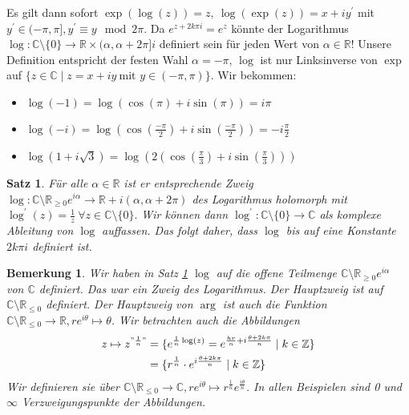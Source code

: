 \documentclass[a4paper,12pt]{article}
\theoremstyle{newthm}
\newtheorem{thm}{Satz}[subsection]
\theoremstyle{newdef}
\theoremstyle{newrem}
\newtheorem*{rem}{Bemerkung}
\newcommand{\Z}{\mathbb{Z}}
\newcommand{\R}{\mathbb{R}}
\newcommand{\C}{\mathbb{C}}
\begin{document}
		Es gilt dann sofort $ \exp(\log(z)) = z,\ \log(\exp(z)) = x+iy^\prime $ mit $ y^\prime \in (-\pi,\pi], y^\prime \equiv y \mod 2\pi. $ Da $ e^{z+2k\pi i} = e^z $ könnte der Logarithmus $ \log: \C \setminus\{0\} \to \R \times (\alpha,\alpha + 2 \pi] i $ definiert sein für jeden Wert von $ \alpha \in \R $! Unsere Definition entspricht der festen Wahl $ \alpha = -\pi $, $\log$ ist nur Linksinverse von $\exp$ auf $ \{ z \in \C \mid z=x+iy\ \text{mit } y \in (-\pi,\pi) \} $. Wir bekommen:
		\begin{itemize}
			\item $ \log(-1) = \log(\cos(\pi) + i\sin(\pi)) = i\pi $
			\item $ \log(-i) = \log\left( \cos \left( \frac{-\pi}{2} \right) + i \sin \left( \frac{-\pi}{2} \right) \right) = -i \frac{\pi}{2} $
			\item $ \log(1+i\sqrt{3}) = \log\left(2\left(\cos \left( \frac{\pi}{3} \right) + i \sin \left( \frac{\pi}{3} \right)\right)\right) $
		\end{itemize}
		
		\begin{thm}\label{thm_logdiff}
			Für alle $ \alpha \in \R $ ist er entsprechende Zweig $ \log: \C \setminus \R_{\geq 0} e^{i\alpha} \to \R + i(\alpha,\alpha + 2\pi) $ des Logarithmus holomorph mit $ \log^\prime(z) = \frac{1}{z}\ \forall z \in \C \setminus \{0\}. $ Wir können dann $ \log^\prime: \C\setminus\{0\} \to \C $ als komplexe Ableitung von $\log$ auffassen. Das folgt daher, dass $\log$ bis auf eine Konstante $ 2k\pi i $ definiert ist.
		\end{thm}
		
		\begin{rem}
			Wir haben in Satz \ref{thm_logdiff} $\log$ auf die offene Teilmenge $ \C \setminus \R_{\geq 0} e^{i\alpha} $ von $\C$ definiert. Das war ein \emph{Zweig} des Logarithmus. Der Hauptzweig ist auf $\C \setminus \R_{\leq 0}$ definiert. Der Hauptzweig von $\arg$ ist auch die Funktion $ \C \setminus \R_{\leq 0} \to \R, re^{i\theta} \mapsto \theta $. Wir betrachten auch die Abbildungen
			\begin{align*}
				z \mapsto z^{"\frac{1}{n}"} &= \{ e^{\frac{1}{n}\log(z)} = e^{\frac{hr}{n} + i \frac{\theta + 2k\pi}{n}} \mid k \in \Z \}\\
				&= \{ r^\frac{1}{n} \cdot e^{i \frac{\theta + 2k\pi}{n}} \mid k \in \Z \}
			\end{align*}
			Wir definieren sie über $ \C \setminus \R_{\leq 0} \to \C, re^{i\theta} \mapsto r^\frac{1}{n} e^\frac{i\theta}{n} $. In allen Beispielen sind 0 und $\infty$ \emph{Verzweigungspunkte} der Abbildungen.
		\end{rem}
	
\end{document}
